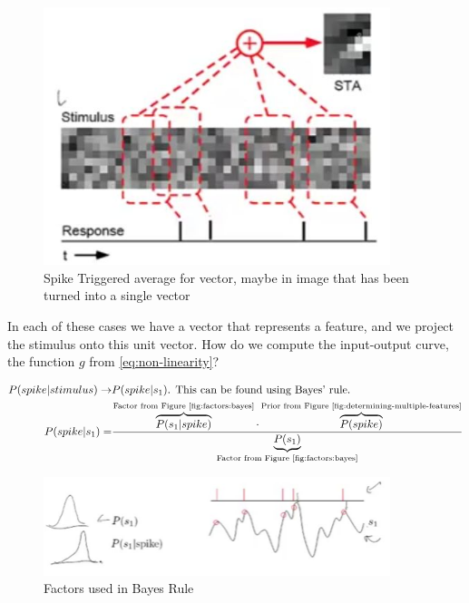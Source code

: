 \documentclass[]{article}
\begin{document}
\begin{figure}[H]
	\caption[Spike Triggered average for vector]{Spike Triggered average for vector, maybe in image that has been turned into a single vector}
	\includegraphics[width=0.9\textwidth]{sta-image}
\end{figure}

In each of these cases we have a vector that represents a feature, and we project the stimulus onto this unit vector. How do we compute the input-output curve, the function $g$ from \eqref{eq:non-linearity}? 

\begin{align*}
	P(spike\vert stimulus) \rightarrow& P(spike\vert s_1) \text{. This can be found using Bayes' rule.}\\
	 P(spike\vert s_1) =& \frac{\overbrace{P(s_1\vert spike)}^\text{Factor from Figure \ref{fig:factors:bayes}} \cdot \overbrace{P(spike)}^\text{Prior from Figure \ref{fig:determining-multiple-features}}}{\underbrace{P(s_1)}_\text{Factor from Figure \ref{fig:factors:bayes}}}
\end{align*}


\begin{figure}[H]
	\caption[Factors used in Bayes Rule]{Factors used in Bayes Rule}\label{fig:factors:bayes}
	\includegraphics[width=0.9\textwidth]{compondents-of bayes}
\end{figure}
\end{document}
